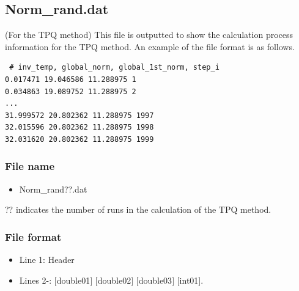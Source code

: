 \newpage
\subsection{Norm\_rand.dat}
\label{Subsec:normrand}
(For the TPQ method) This file is outputted to show the calculation process information for the TPQ method.
An example of the file format is as follows.\\
\begin{minipage}{12.5cm}
\begin{screen}
\begin{verbatim}
 # inv_temp, global_norm, global_1st_norm, step_i 
0.017471 19.046586 11.288975 1
0.034863 19.089752 11.288975 2
...
31.999572 20.802362 11.288975 1997
32.015596 20.802362 11.288975 1998
32.031620 20.802362 11.288975 1999
\end{verbatim}
\end{screen}
\end{minipage}

\subsubsection{File name}
 \begin{itemize}
   \item Norm\_rand??.dat
  \end{itemize}
  ?? indicates the number of runs in the calculation of the TPQ method.

\subsubsection{File format}
 \begin{itemize}
   \item Line 1: Header
   \item Lines 2-: $[$double01$]$ $[$double02$]$ $[$double03$]$ $[$int01$]$.
  \end{itemize}
  
